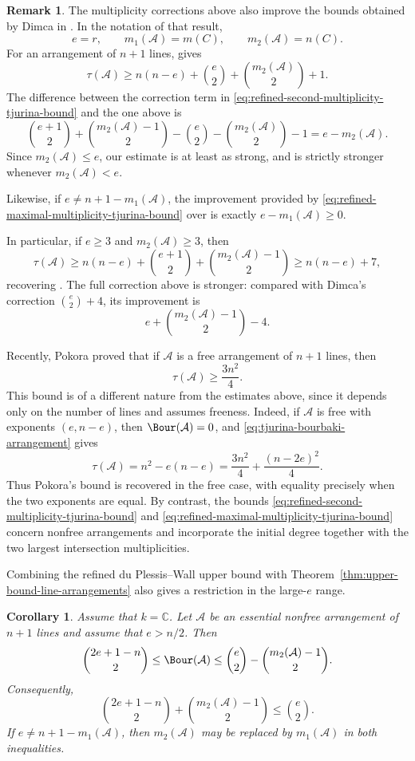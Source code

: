 \documentclass[11pt]{amsart}   %
\newtheorem{Corollary}[Theorem]{Corollary}
\theoremstyle{definition}
\newtheorem{Remark}[Theorem]{Remark}
\def\NZQ{\mathbb}               %
\def\CC{{\NZQ C}}
\def\A{{\mathcal A}}
\begin{document}
\begin{Remark}
\label{rem:comparison-dimca-tjurina}
The multiplicity corrections above also improve the bounds obtained by Dimca in \cite[Theorem~1.3]{Dimca-minimal-Tjurina}. In the notation of that result,
\[
e=r,\qquad
m_1(\A)=m(C),\qquad
m_2(\A)=n(C).
\]
For an arrangement of $n+1$ lines, \cite[Theorem~1.3(i)]{Dimca-minimal-Tjurina} gives
\[
\tau(\A)\geq
n(n-e)+\binom e2+\binom{m_2(\A)}2+1.
\]
The difference between the correction term in \eqref{eq:refined-second-multiplicity-tjurina-bound} and the one above is
\[
\binom{e+1}{2}
+\binom{m_2(\A)-1}{2} -\binom e2-\binom{m_2(\A)}2-1
=
e-m_2(\A).
\]
Since $m_2(\A)\leq e$, our estimate is at least as strong, and is strictly stronger whenever $m_2(\A)<e$.

Likewise, if $e\neq n+1-m_1(\A)$, the improvement provided by \eqref{eq:refined-maximal-multiplicity-tjurina-bound} over \cite[Theorem~1.3(ii)]{Dimca-minimal-Tjurina} is exactly $e-m_1(\A)\geq0$.

In particular, if $e\geq3$ and $m_2(\A)\geq3$, then
\[
\tau(\A)\geq
n(n-e) +\binom{e+1}{2} +\binom{m_2(\A)-1}{2} \geq n(n-e)+7,
\]
recovering \cite[Corollary~1.4]{Dimca-minimal-Tjurina}. The full correction above is stronger: compared with Dimca's correction $\binom e2+4$, its improvement is
\[
e+\binom{m_2(\A)-1}{2}-4.
\]

Recently, Pokora \cite[Corollary~4.2]{Pokora-Tjurina-bounds}
proved that if $\A$ is a free arrangement of $n+1$ lines, then
\[
\tau(\A)\geq\frac{3n^2}{4}.
\]
This bound is of a different nature from the estimates above, since it
depends only on the number of lines and assumes freeness. Indeed, if
$\A$ is free with exponents $(e,n-e)$, then
$\Bour(\A)=0$, and \eqref{eq:tjurina-bourbaki-arrangement} gives
\[
\tau(\A)
=n^2-e(n-e)
=
\frac{3n^2}{4}
+\frac{(n-2e)^2}{4}.
\]
Thus Pokora's bound is recovered in the free case, with equality
precisely when the two exponents are equal. By contrast, the bounds
\eqref{eq:refined-second-multiplicity-tjurina-bound} and
\eqref{eq:refined-maximal-multiplicity-tjurina-bound} concern
nonfree arrangements and incorporate the initial degree together with
the two largest intersection multiplicities.
\end{Remark}

Combining the refined du Plessis--Wall upper bound with Theorem~\ref{thm:upper-bound-line-arrangements} also gives a restriction in the large-$e$ range.

\begin{Corollary}
\label{cor:large-e-bourbaki-window}
Assume that $k=\CC$. Let $\A$ be an essential nonfree arrangement of $n+1$ lines and assume that $e>n/2$. Then
\[
\binom{2e+1-n}{2}
\leq
\Bour(\A)
\leq
\binom e2-\binom{m_2(\A)-1}{2}.
\]
Consequently,
\[
\binom{2e+1-n}{2}
+\binom{m_2(\A)-1}{2} \leq
\binom e2.
\]
If $e\neq n+1-m_1(\A)$, then $m_2(\A)$ may be replaced by $m_1(\A)$ in both inequalities.
\end{Corollary}
\end{document}
